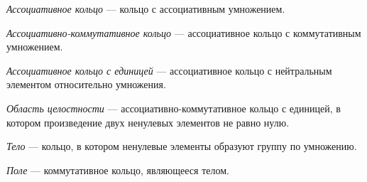 \begin{definition}
    \textit{Ассоциативное кольцо} --- кольцо с ассоциативным умножением.
\end{definition}

\begin{definition}
    \textit{Ассоциативно-коммутативное кольцо} --- ассоциативное кольцо с коммутативным умножением.
\end{definition}

\begin{definition}
    \textit{Ассоциативное кольцо с единицей} --- ассоциативное кольцо с нейтральным элементом относительно умножения.
\end{definition}

\begin{definition}
    \textit{Область целостности} --- ассоциативно-коммутативное кольцо с единицей, в котором произведение двух ненулевых элементов не равно нулю.
\end{definition}

\begin{definition}
    \textit{Тело} --- кольцо, в котором ненулевые элементы образуют группу по умножению.
\end{definition}

\begin{definition}
    \textit{Поле} --- коммутативное кольцо, являющееся телом.
\end{definition}